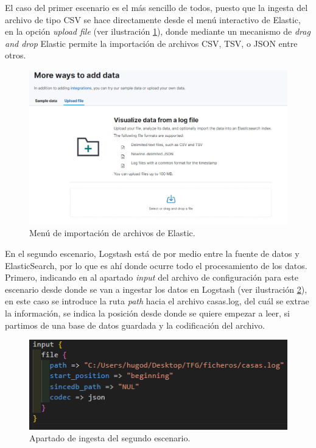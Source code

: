 El caso del primer escenario es el más sencillo de todos, puesto que la ingesta del archivo de tipo CSV se hace directamente desde el menú interactivo de Elastic, en la opción \textit{upload file}  (ver ilustración  \ref{fig:ingesta1}), donde mediante un mecanismo de \textit{drag and drop} Elastic permite la importación de archivos CSV, TSV, o JSON entre otros. 

\begin{figure}
    \centering
    \includegraphics[width=1\linewidth]{img/ingesta1.png}
    \caption{Menú de importación de archivos de Elastic.}
    \label{fig:ingesta1}
\end{figure}

En el segundo escenario, Logstash está de por medio entre la fuente de datos y ElasticSearch, por lo que es ahí donde ocurre todo el procesamiento de los datos. Primero, indicando en al apartado \textit{input} del archivo de configuración para este escenario desde donde se van a ingestar los datos en Logstash  (ver ilustración  \ref{fig:ingesta2}), en este caso se introduce la ruta \textit{path} hacia el archivo casas.log, del cuál se extrae la información, se indica la posición desde donde se quiere empezar a leer, si partimos de una base de datos guardada y la codificación del archivo.

\begin{figure}
    \centering
    \includegraphics[width=1\linewidth]{img/ingesta2.png}
    \caption{Apartado de ingesta del segundo escenario.}
    \label{fig:ingesta2}
\end{figure}


